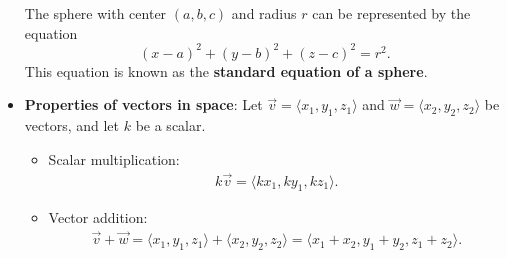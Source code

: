 \documentclass{report}
\begin{document}
\begin{itemize}
        The sphere with center $(a,b,c)$ and radius $r$ can be represented by the equation
        \[
            (x - a)^2 + (y - b)^2 + (z - c)^2 = r^2.
        \]
        This equation is known as the \textbf{standard equation of a sphere}.
    \item \textbf{Properties of vectors in space}:
        Let $\vec{v} = \langle x_1, y_1, z_1 \rangle$ and $\vec{w} = \langle x_2, y_2, z_2 \rangle$ be vectors, and let $k$ be a scalar.
        \begin{itemize}
            \item Scalar multiplication:
                \begin{align*}
                     k\vec{v} = \langle kx_1, ky_1, kz_1 \rangle
                .\end{align*}
            \item Vector addition: 
                \begin{align*}
                    \vec{v} + \vec{w} = \langle x_1, y_1, z_1 \rangle + \langle x_2, y_2, z_2 \rangle = \langle x_1 + x_2, y_1 + y_2, z_1 + z_2 \rangle
                .\end{align*}


\end{itemize}
\end{itemize}
\end{document}
